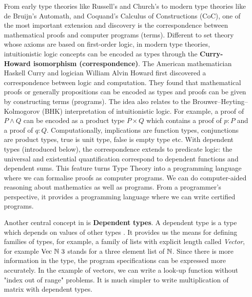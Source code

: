From early type theories like Russell's and Church's to modern type theories like de Bruijn's Automath, \mltt and Coquand's Calculus of Constructions (CoC), one of the most important extension and discovery is the correspondence between mathematical proofs and computer programs (terms).
Different to set theory whose axioms are based on first-order logic, in modern type theories, intuitionistic logic concepts can be encoded as types through the 
\textbf{Curry-Howard isomorphism (correspondence)}.
The American mathematician Haskell Curry and logician William Alvin Howard first discovered a correspondence between logic and computation. They found that mathematical proofs or generally propositions can be encoded as types and proofs can be given by constructing terms (programs). The idea also relates to the Brouwer–Heyting–Kolmogorov (BHK) interpretation of intuitionistic logic. For example, a proof of $P \wedge Q$ can be encoded as a product type $P \times Q$ which contains a proof of $p : P$ and a proof of $q : Q$. Computationally, implications are function types, conjunctions are product types, true is unit type, false is empty type etc. 
With dependent types (introduced below), the correspondence extends to predicate logic: the universal and existential quantification correspond to dependent functions and dependent sums. 
This feature turns Type Theory into a programming language where we can formalise proofs as computer programs. We can do computer-aided reasoning about mathematics as well as programs. From a programmer's perspective, it provides a programming language where we can write certified programs.


Another central concept in \mltt is \textbf{Dependent types}.
A dependent type is a type which depends on values of other types \cite{dtw}. It provides us the means for defining families of types, for example, a family of lists with explicit length called \emph{Vector}, for example $\text{Vec} ~\mathbb{N} ~3$ stands for a three element list of $\mathbb{N}$. Since there is more information in the type, the program specifications can be expressed more accurately. In the example of vectors, we can write a look-up function without "index out of range" problems. It is much simpler to write multiplication of matrix with dependent types.


